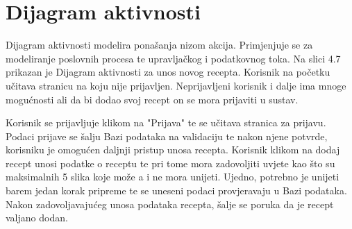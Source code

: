 \eject

\section{Dijagram aktivnosti}

Dijagram aktivnosti modelira ponašanja nizom akcija. Primjenjuje se za modeliranje poslovnih procesa te upravljačkog i podatkovnog toka. Na slici 4.7 prikazan je Dijagram aktivnosti za unos novog recepta. Korisnik na početku učitava stranicu na koju nije prijavljen. Neprijavljeni korisnik i dalje ima mnoge mogućnosti ali da bi dodao svoj recept on se mora prijaviti u sustav. 

Korisnik se prijavljuje klikom na "Prijava" te se učitava stranica za prijavu. Podaci prijave se šalju Bazi podataka na validaciju te nakon njene potvrde, korisniku je omogućen daljnji pristup unosa recepta. Korisnik klikom na dodaj recept unosi podatke o receptu te pri tome mora zadovoljiti uvjete kao što su maksimalnih 5 slika koje može a i ne mora unijeti. Ujedno, potrebno je unijeti barem jedan korak pripreme te se uneseni podaci provjeravaju u Bazi podataka. Nakon zadovoljavajućeg unosa podataka recepta, šalje se poruka da je recept valjano dodan.

